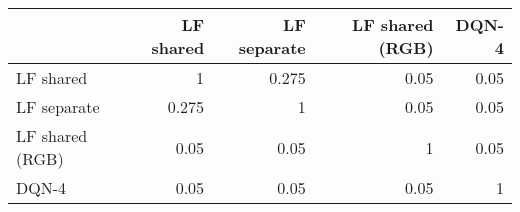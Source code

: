 \begin{tabular}{lrrrr}
\hline
                 &   LF shared &   LF separate &   LF shared (RGB) &   DQN-4 \\
\hline
 LF shared       &       1     &         0.275 &              0.05 &    0.05 \\
 LF separate     &       0.275 &         1     &              0.05 &    0.05 \\
 LF shared (RGB) &       0.05  &         0.05  &              1    &    0.05 \\
 DQN-4           &       0.05  &         0.05  &              0.05 &    1    \\
\hline
\end{tabular}